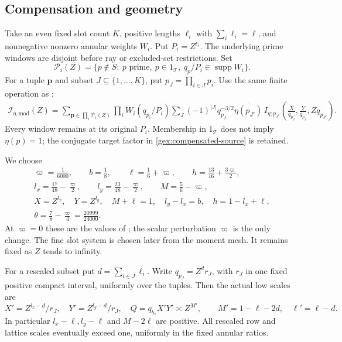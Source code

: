 \subsection{Compensation and geometry}

Take an even fixed slot count $K$, positive lengths $\ell_i$ with
$\sum_i\ell_i=\ell$, and nonnegative nonzero annular weights $W_i$.
Put $P_i=Z^{\ell_i}$. The underlying prime windows are disjoint
before ray or excluded-set restrictions. Set
\[
 \mathcal P_i(Z)=\{p\notin S:\ p\text{ prime},\ p\in1_{\mathcal T},
                 \ q_p/P_i\in\operatorname{supp}W_i\}.
\]
For a tuple $\boldsymbol p$ and subset
$J\subseteq\{1,\ldots,K\}$, put $p_J=\prod_{i\in J}p_i$.
Use the same finite operation as \cite[(12.5)]{OAI26}:
\begin{equation}\label{gex:compensated-source}
\begin{split}
 \mathcal I_{\eta,\mathrm{mod}}(Z)=
 \sum_{\boldsymbol p\in\prod_i\mathcal P_i(Z)}
 \prod_iW_i(q_{p_i}/P_i)
 \sum_J(-1)^{|J|}q_{p_J}^{-3/2}\overline{\eta(p_{J^c})}\,
 I_{\eta;p_{J^c}}\!\left(\frac{X}{q_{p_J}},\frac{Y}{q_{p_J}},
                           Zq_{p_{J^c}}\right).
\end{split}
\end{equation}
Every window remains at its original $P_i$. Membership in
$1_{\mathcal T}$ does not imply $\eta(p)=1$; the conjugate target
factor in \eqref{gex:compensated-source} is retained.

We choose
\begin{equation}\label{gex:geometry}
\begin{gathered}
 \varpi=\frac1{6000},\qquad b=\frac18,\qquad
 \ell=\frac16+\varpi,\qquad h=\frac{13}{16}+\frac{3\varpi}{2},\\
 l_x=\frac{17}{48}-\frac\varpi2,\qquad
 l_y=\frac{23}{48}-\frac\varpi2,\qquad M=\frac56-\varpi,\\
 X=Z^{l_x},\quad Y=Z^{l_y},\quad
 M+\ell=1,\quad l_y-l_x=b,\quad h=1-l_x+\ell,\\
 \theta=\frac78-\frac\varpi4=\frac{20999}{24000}.
\end{gathered}
\end{equation}
At $\varpi=0$ these are the values of \cite[(12.4)]{OAI26}; the scalar
perturbation $\varpi$ is the only change. The fine slot system is
chosen later from the moment mesh. It remains fixed as $Z$ tends to infinity.

For a rescaled subset put $d=\sum_{i\in J}\ell_i$. Write
$q_{p_J}=Z^d r_J$, with $r_J$ in one fixed positive compact
interval, uniformly over the tuples. Then the actual low scales are
\[
 X'=Z^{l_x-d}/r_J,\quad Y'=Z^{l_y-d}/r_J,\quad
 Q=q_{b_*}X'Y'\asymp Z^{M'},\qquad
 M'=1-\ell-2d,\quad \ell'=\ell-d.
\]
In particular $l_x-\ell,l_y-\ell$ and $M-2\ell$ are positive.
All rescaled row and lattice scales eventually exceed one, uniformly
in the fixed annular ratios.

